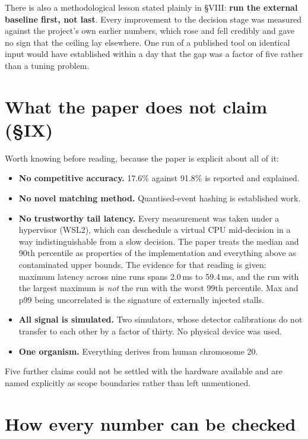 \documentclass[11pt,a4paper]{article}
\begin{document}
There is also a methodological lesson stated plainly in §VIII: \textbf{run the external
baseline first, not last}. Every improvement to the decision stage was measured against the
project's own earlier numbers, which rose and fell credibly and gave no sign that the ceiling
lay elsewhere. One run of a published tool on identical input would have established within a
day that the gap was a factor of five rather than a tuning problem.

\section{What the paper does not claim \hfill\small(§IX)}

Worth knowing before reading, because the paper is explicit about all of it:

\begin{itemize}
\item \textbf{No competitive accuracy.} 17.6\% against 91.8\% is reported and explained.
\item \textbf{No novel matching method.} Quantised-event hashing is established work.
\item \textbf{No trustworthy tail latency.} Every measurement was taken under a hypervisor
      (WSL2), which can deschedule a virtual CPU mid-decision in a way indistinguishable from
      a slow decision. The paper treats the median and 90th percentile as properties of the
      implementation and everything above as contaminated upper bounds. The evidence for that
      reading is given: maximum latency across nine runs spans 2.0\,ms to 59.4\,ms, and the
      run with the largest maximum is \emph{not} the run with the worst 99th percentile. Max
      and p99 being uncorrelated is the signature of externally injected stalls.
\item \textbf{All signal is simulated.} Two simulators, whose detector calibrations do not
      transfer to each other by a factor of thirty. No physical device was used.
\item \textbf{One organism.} Everything derives from human chromosome 20.
\end{itemize}

Five further claims could not be settled with the hardware available and are named explicitly
as scope boundaries rather than left unmentioned.

\section{How every number can be checked}
\end{document}

